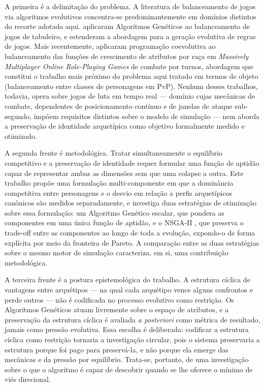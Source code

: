 A primeira é a delimitação do problema. A literatura de balanceamento de jogos via algoritmos evolutivos concentra-se predominantemente em domínios distintos do recorte adotado aqui.  aplicaram Algoritmos Genéticos ao balanceamento de jogos de tabuleiro, e  estenderam a abordagem para a geração evolutiva de regras de jogos. Mais recentemente,  aplicaram programação coevolutiva ao balanceamento das funções de crescimento de atributos por raça em \textit{Massively Multiplayer Online Role-Playing Games} de combate por turnos, abordagem que constitui o trabalho mais próximo do problema aqui tratado em termos de objeto (balanceamento entre classes de personagens em PvP). Nenhum desses trabalhos, todavia, opera sobre jogos de luta em tempo real --- domínio cujas mecânicas de combate, dependentes de posicionamento contínuo e de janelas de ataque sub-segundo, impõem requisitos distintos sobre o modelo de simulação --- nem aborda a preservação de identidade arquetípica como objetivo formalmente medido e otimizado.

A segunda frente é metodológica. Tratar simultaneamente o equilíbrio competitivo e a preservação de identidade requer formular uma função de aptidão capaz de representar ambas as dimensões sem que uma colapse a outra. Este trabalho propõe uma formulação multi-componente em que a dominância competitiva entre personagens e o desvio em relação a perfis arquetípicos canônicos são medidos separadamente, e investiga duas estratégias de otimização sobre essa formulação: um Algoritmo Genético escalar, que pondera as componentes em uma única função de aptidão, e o NSGA-II \cite{deb2002nsga}, que preserva o trade-off entre as componentes ao longo de toda a evolução, expondo-o de forma explícita por meio da fronteira de Pareto. A comparação entre as duas estratégias sobre o mesmo motor de simulação caracteriza, em si, uma contribuição metodológica.

A terceira frente é a postura epistemológica do trabalho. A estrutura cíclica de vantagens entre arquétipos --- na qual cada arquétipo vence alguns confrontos e perde outros --- não é codificada no processo evolutivo como restrição. Os Algoritmos Genéticos atuam livremente sobre o espaço de atributos, e a preservação da estrutura cíclica é avaliada \textit{a posteriori} como métrica de resultado, jamais como pressão evolutiva. Essa escolha é deliberada: codificar a estrutura cíclica como restrição tornaria a investigação circular, pois o sistema preservaria a estrutura porque foi pago para preservá-la, e não porque ela emerge das mecânicas e da pressão por equilíbrio. Trata-se, portanto, de uma investigação sobre o que o algoritmo é capaz de descobrir quando se lhe oferece o mínimo de viés direcional.

